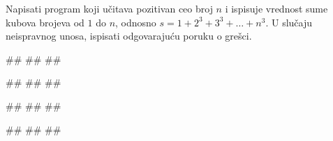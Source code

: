\begin{Exercise}[label=PET_38] 
Napisati program koji učitava pozitivan ceo broj $n$ i ispisuje
vrednost sume kubova brojeva od $1$ do $n$, odnosno $s = 1+2^3+3^3+
\ldots +n^3$. 
U slučaju neispravnog unosa, ispisati odgovarajuću poruku o grešci.

\begin{miditest}
\begin{upotreba}{1}
#\naslovInt#
##
##
\end{upotreba}
\end{miditest}
\begin{miditest}
\begin{upotreba}{2}
#\naslovInt#
##
##
\end{upotreba}
\end{miditest}

\begin{miditest}
\begin{upotreba}{3}
#\naslovInt#
##
##
\end{upotreba}
\end{miditest}
\begin{miditest}
\begin{upotreba}{4}
#\naslovInt#
##
##
\end{upotreba}
\end{miditest}

\end{Exercise}
\ifresenja
\begin{Answer}[ref=PET_38]
\end{Answer}
\fi


